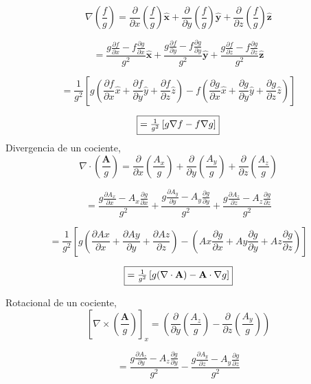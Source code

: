 \documentclass[12pt]{article}
\begin{document}
\[
\nabla \left( \frac{f}{g} \right) = \frac{\partial}{\partial x} \left( \frac{f}{g} \right) \hat{\mathbf{x}} + \frac{\partial}{\partial y} \left( \frac{f}{g} \right) \hat{\mathbf{y}} + \frac{\partial}{\partial z} \left( \frac{f}{g} \right) \hat{\mathbf{z}}
\]

\[
= \frac{g \frac{\partial f}{\partial x} - f \frac{\partial g}{\partial x}}{g^2} \hat{\mathbf{x}} + \frac{g \frac{\partial f}{\partial y} - f \frac{\partial g}{\partial y}}{g^2} \hat{\mathbf{y}} + \frac{g \frac{\partial f}{\partial z} - f \frac{\partial g}{\partial z}}{g^2} \hat{\mathbf{z}}
\]

\[
= \frac{1}{g^2} \left[ g \left( \frac{\partial f}{\partial x} \hat{x} + \frac{\partial f}{\partial y} \hat{y} + \frac{\partial f}{\partial z} \hat{z} \right) - f \left( \frac{\partial g}{\partial x} \hat{x} + \frac{\partial g}{\partial y} \hat{y} + \frac{\partial g}{\partial z} \hat{z} \right) \right]
\]

\[\fbox{$
= \frac{1}{g^2} \left[ g \nabla f - f \nabla g \right]$}
\]
Divergencia de un cociente,
\[
\nabla \cdot \left( \frac{\mathbf{A}}{g} \right) = \frac{\partial}{\partial x} \left( \frac{A_x}{g} \right) + \frac{\partial}{\partial y} \left( \frac{A_y}{g} \right) + \frac{\partial}{\partial z} \left( \frac{A_z}{g} \right)
\]

\[
= \frac{g \frac{\partial A_x}{\partial x} - A_x \frac{\partial g}{\partial x}}{g^2} + \frac{g \frac{\partial A_y}{\partial y} - A_y \frac{\partial g}{\partial y}}{g^2} + \frac{g \frac{\partial A_z}{\partial z} - A_z \frac{\partial g}{\partial z}}{g^2}
\]

\[
= \frac{1}{g^2} \left[ g \left( \frac{\partial Ax}{\partial x}  + \frac{\partial Ay}{\partial y}  + \frac{\partial Az}{\partial z}  \right) -  \left( Ax\frac{\partial g}{\partial x} + Ay\frac{\partial g}{\partial y}  + Az\frac{\partial g}{\partial z}  \right) \right]
\]

\[\fbox{$
= \frac{1}{g^2} \left[ g (\nabla \cdot \mathbf{A}) - \mathbf{A} \cdot \nabla g \right]$}
\]

Rotacional de un cociente,
\[
\left[ \nabla \times \left( \frac{\mathbf{A}}{g} \right) \right]_x = \left( \frac{\partial}{\partial y} \left( \frac{A_z}{g} \right) - \frac{\partial}{\partial z} \left( \frac{A_y}{g} \right) \right)
\]

\[
= \frac{g \frac{\partial A_z}{\partial y} - A_z \frac{\partial g}{\partial y}}{g^2} - \frac{g \frac{\partial A_y}{\partial z} - A_y \frac{\partial g}{\partial z}}{g^2}
\]
\end{document}

